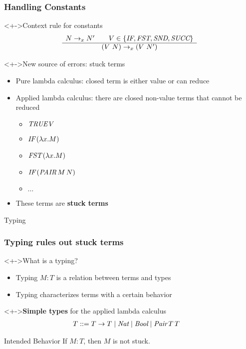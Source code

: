 \documentclass[pdftex,aspectratio=169]{beamer}
\begin{document}
\begin{frame}[fragile]
  \frametitle{Handling Constants}
  \begin{block}<+->{Context rule for constants}%
    \begin{displaymath}
      \begin{array}{c}
        N \rightarrow_x N'
        \qquad V \in \{ \textit{IF}, \textit{FST}, \textit{SND}, \textit{SUCC} \}
        \\\hline
        (V~N) \rightarrow_x (V~N')
      \end{array}
    \end{displaymath}
  \end{block}
  
  
  \begin{block}<+->{New source of errors: stuck terms}
    \begin{itemize}
    \item Pure lambda calculus: closed term is either value or can reduce
    \item Applied lambda calculus: there are closed non-value terms that cannot be reduced
      \begin{itemize}
      \item $\textit{TRUE}\,V$ 
      \item $\textit{IF}\,(\lambda x.M)$
      \item $\textit{FST}\,(\lambda x.M)$
      \item $\textit{IF}\,(\textit{PAIR}\, M\, N)$
      \item $\dots$
      \end{itemize}
    \item These terms are \textbf{stuck terms}
    \end{itemize}
  \end{block}
\end{frame}

\begin{frame}
  \fontsize{1.5cm}{1.6cm}\selectfont\centering{}%
  Typing
\end{frame}

\begin{frame}[fragile]
  \frametitle{Typing rules out stuck terms }
  \begin{alertblock}<+->{What is a typing?}
    \begin{itemize}
    \item Typing $M:T$ is a relation between terms and types
    \item Typing characterizes terms with a certain behavior
  \end{itemize}
  \end{alertblock}
  \begin{alertblock}<+->{\textbf{Simple types} for the applied lambda calculus}
    \begin{align*}
      T &::= T \to T \mid \textit{Nat} \mid \textit{Bool} \mid \textit{Pair}\,T\,T
    \end{align*}
    \begin{block}{Intended Behavior}
      If $M:T$, then $M$ is not stuck.
    \end{block}
  \end{alertblock}
\end{frame}
\end{document}
